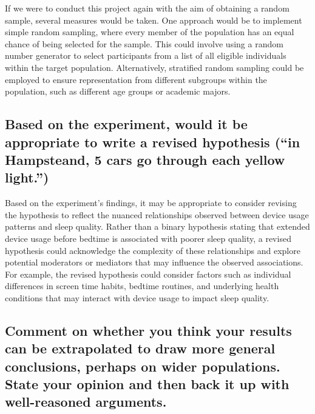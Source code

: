 \documentclass[11pt]{article}
\begin{document}
If we were to conduct this project again with the aim of obtaining a
random sample, several measures would be taken. One approach would be to
implement simple random sampling, where every member of the population
has an equal chance of being selected for the sample. This could involve
using a random number generator to select participants from a list of
all eligible individuals within the target population. Alternatively,
stratified random sampling could be employed to ensure representation
from different subgroups within the population, such as different age
groups or academic majors.

\hypertarget{based-on-the-experiment-would-it-be-appropriate-to-write-a-revised-hypothesis-in-hampsteand-5-cars-go-through-each-yellow-light.}{%
\subsection{Based on the experiment, would it be appropriate to write a
revised hypothesis (``in Hampsteand, 5 cars go through each yellow
light.'')}\label{based-on-the-experiment-would-it-be-appropriate-to-write-a-revised-hypothesis-in-hampsteand-5-cars-go-through-each-yellow-light.}}

Based on the experiment's findings, it may be appropriate to consider
revising the hypothesis to reflect the nuanced relationships observed
between device usage patterns and sleep quality. Rather than a binary
hypothesis stating that extended device usage before bedtime is
associated with poorer sleep quality, a revised hypothesis could
acknowledge the complexity of these relationships and explore potential
moderators or mediators that may influence the observed associations.
For example, the revised hypothesis could consider factors such as
individual differences in screen time habits, bedtime routines, and
underlying health conditions that may interact with device usage to
impact sleep quality.

\hypertarget{comment-on-whether-you-think-your-results-can-be-extrapolated-to-draw-more-general-conclusions-perhaps-on-wider-populations.-state-your-opinion-and-then-back-it-up-with-well-reasoned-arguments.}{%
\subsection{Comment on whether you think your results can be
extrapolated to draw more general conclusions, perhaps on wider
populations. State your opinion and then back it up with well-reasoned
arguments.}\label{comment-on-whether-you-think-your-results-can-be-extrapolated-to-draw-more-general-conclusions-perhaps-on-wider-populations.-state-your-opinion-and-then-back-it-up-with-well-reasoned-arguments.}}
\end{document}

